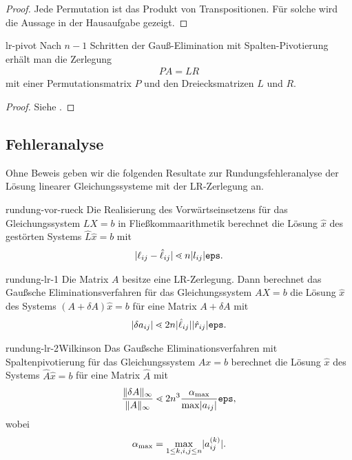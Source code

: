 \begin{proof}
  Jede Permutation ist das Produkt von Transpositionen. Für solche
  wird die Aussage in der Hausaufgabe gezeigt.
\end{proof}

\begin{Satz}{lr-pivot}
  Nach $n-1$ Schritten der Gauß-Elimination mit Spalten-Pivotierung
  erhält man die Zerlegung
  \begin{gather}
    PA = LR
  \end{gather}
  mit einer Permutationsmatrix $P$ und den Dreiecksmatrizen $L$ und $R$.
\end{Satz}

\begin{proof}
  Siehe \cite[Abschnitt 1.3]{DeuflhardHohmann08}.
\end{proof}

\subsection{Fehleranalyse}

Ohne Beweis geben wir die folgenden Resultate zur
Rundungsfehleranalyse der Lösung linearer
Gleichungssysteme mit der LR-Zerlegung an.

\begin{Lemma}{rundung-vor-rueck}
  Die Realisierung des Vorwärtseinsetzens für das Gleichungssystem
  $LX = b$ in Fließkommaarithmetik berechnet die Lösung $\hat x$ des
  gestörten Systems $\hat L \hat x = b$ mit
  \begin{gather}
    \lvert\ell_{ij} - \hat\ell_{ij}\rvert
    \lessdot n \lvert l_{ij}\rvert \texttt{eps}.
  \end{gather}
\end{Lemma}

\begin{Lemma}{rundung-lr-1}
  Die Matrix $A$ besitze eine LR-Zerlegung. Dann berechnet das
  Gaußsche Eliminationsverfahren für das Gleichungssystem $AX=b$ die
  Lösung $\hat x$ des Systems $(A+\delta A) \hat x = b$ für eine Matrix
  $A+\delta A$ mit
  \begin{gather}
    \lvert\delta a_{ij}\rvert \lessdot 2n \lvert\hat \ell_{ij}\rvert
    \lvert\hat r_{ij}\rvert\texttt{eps}.
  \end{gather}
\end{Lemma}

\begin{Satz*}{rundung-lr-2}{Wilkinson}
  Das Gaußsche Eliminationsverfahren mit Spaltenpivotierung für das
  Gleichungssystem $Ax=b$ berechnet die Lösung $\hat x$ des Systems
  $\hat A \hat x = b$ für eine Matrix $\hat A$ mit
  \begin{gather}
    \frac{\lVert\delta A\rVert_\infty}{\lVert A\rVert_\infty}
    \lessdot 2 n^3 \frac{\alpha_{\max}}{\max \lvert a_{ij}\rvert} \texttt{eps},
  \end{gather}
  wobei
  \begin{gather}
    \alpha_{\max} = \max_{1\le k,i,j\le n} \lvert a^{(k)}_{ij}\rvert.
  \end{gather}
\end{Satz*}


